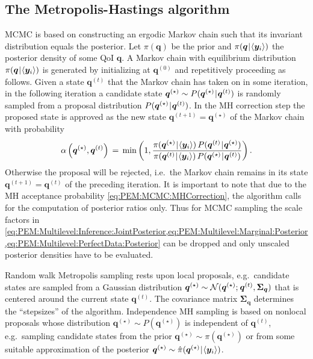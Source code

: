 \subsection{The Metropolis-Hastings algorithm} \label{sec:PEM:Computations:MH}
MCMC is based on constructing an ergodic Markov chain such that its invariant distribution equals the posterior.
Let \(\pi(\bm{q})\) be the prior and \(\pi(\bm{q} {\:\!}|{\:\!} \langle{\bm{y}_i}\rangle)\) the posterior density of some QoI \(\bm{q}\).
A Markov chain with equilibrium distribution \(\pi(\bm{q} {\:\!}|{\:\!} \langle{\bm{y}_i}\rangle)\) is generated by initializing at \(\bm{q}^{(0)}\) and repetitively proceeding as follows.
Given a state \(\bm{q}^{(t)}\) that the Markov chain has taken on in some iteration, in the following iteration a candidate state
\(\bm{q}^{(\star)} \sim P(\bm{q}^{(\star)} {\:\!}|{\:\!} \bm{q}^{(t)})\) is randomly sampled from a proposal distribution \(P(\bm{q}^{(\star)} {\:\!}|{\:\!} \bm{q}^{(t)})\).
In the MH correction step the proposed state is approved as the new state \(\bm{q}^{(t+1)} = \bm{q}^{(\star)}\) of the Markov chain with probability
\begin{equation} \label{eq:PEM:MCMC:MHCorrection}
  \alpha \left( \bm{q}^{(\star)}, \bm{q}^{(t)} \right)
  \, = \, \mathrm{min} \left( 1,\frac{ \pi(\bm{q}^{(\star)} \cond \tuple{\bm{y}_i}) \, P(\bm{q}^{(t)} \cond \bm{q}^{(\star)}) }
                                     { \pi(\bm{q}^{(t)} \cond \tuple{\bm{y}_i}) \, P(\bm{q}^{(\star)} \cond \bm{q}^{(t)})     } \right).
\end{equation}
Otherwise the proposal will be rejected, i.e.\ the Markov chain remains in its state \(\bm{q}^{(t+1)} = \bm{q}^{(t)}\) of the preceding iteration.
It is important to note that due to the MH acceptance probability \cref{eq:PEM:MCMC:MHCorrection}, the algorithm calls for the computation of posterior ratios only.
Thus for MCMC sampling the scale factors in \cref{eq:PEM:Multilevel:Inference:JointPosterior,eq:PEM:Multilevel:Marginal:Posterior,eq:PEM:Multilevel:PerfectData:Posterior}
can be dropped and only unscaled posterior densities have to be evaluated.
\par %
Random walk Metropolis sampling rests upon local proposals, e.g.\ candidate states are sampled from a Gaussian distribution
\(\bm{q}^{(\star)} \sim \mathcal{N}(\bm{q}^{(\star)} ;{\:\!} \bm{q}^{(t)},\bm{\Sigma}_{\bm{q}})\) that is centered around the current state \(\bm{q}^{(t)}\).
The covariance matrix \(\bm{\Sigma}_{\bm{q}}\) determines the ``stepsizes'' of the algorithm.
Independence MH sampling is based on nonlocal proposals whose distribution \(\bm{q}^{(\star)} \sim P(\bm{q}^{(\star)})\) is independent of \(\bm{q}^{(t)}\),
e.g.\ sampling candidate states from the prior \(\bm{q}^{(\star)} \sim \pi(\bm{q}^{(\star)})\) or from some suitable approximation of the posterior \(\bm{q}^{(\star)} \sim \hat{\pi}(\bm{q}^{(\star)} {\:\!}|{\:\!} \langle{\bm{y}_i}\rangle)\).

